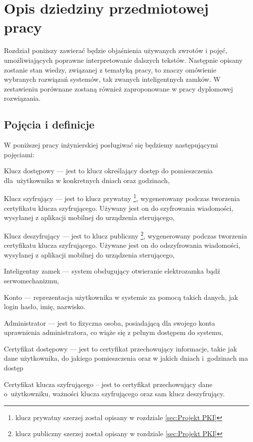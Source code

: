 % 
\newpage
\section{Opis dziedziny przedmiotowej pracy}\label{sec:dziedzina}
Rozdział poniższy zawierać będzie objaśnienia używanych zwrotów i pojęć, umożliwiających poprawne interpretowanie dalszych tekstów. Następnie opisany zostanie stan wiedzy, związanej z tematyką pracy, to znaczy omówienie wybranych rozwiązań systemów, tak zwanych inteligentnych zamków. W zestawieniu porównane zostaną również zaproponowane w pracy dyplomowej rozwiązania.
\subsection{Pojęcia i definicje}\label{sec:Pojęcia i definicje}
W poniższej pracy inżynierskiej posługiwać się będziemy następującymi pojęciami:
\begin{itemize*}
	\item {Klucz dostępowy} --- jest to  klucz określający dostęp do pomieszczenia dla~użytkownika w konkretnych dniach oraz godzinach,
	\item {Klucz szyfrujący} 
	--- jest to klucz prywatny \footnote{ klucz prywatny szerzej został opisany w rozdziale \ref{sec:Projekt PKI}}, wygenerowany podczas tworzenia certyfikatu klucza szyfrującego. Używany jest on do szyfrowania wiadomości, wysyłanej z aplikacji mobilnej do urządzenia sterującego,
	\item {Klucz deszyfrujący }
	--- jest to klucz publiczny \footnote{ klucz publiczny szerzej został opisany w rozdziale \ref{sec:Projekt PKI}}, wygenerowany podczas tworzenia certyfikatu klucza szyfrującego. Używane jest on do odszyfrowania wiadomości, wysyłanej z aplikacji mobilnej do urządzenia sterującego,
	\item {Inteligentny zamek}
	--- system obsługujący otwieranie elektrozamka bądź serwomechanizmu,
	\item {Konto}
	--- reprezentacja użytkownika w systemie za pomocą takich danych, jak login hasło, imię, nazwisko.
	\item {Administrator}
	--- jest to fizyczna osoba, posiadającą dla swojego konta uprawnienia administratora, co wiąże się z pełnym dostępem do systemu,
	\item {Certyfikat dostępowy}
	--- jest to certyfikat przechowujący informacje, takie jak dane użytkownika, do jakiego pomieszczenia oraz w jakich dniach i~godzinach	ma dostęp
	\item {Certyfikat klucza szyfrującego}
	-- jest to certyfikat przechowujący dane o~użytkowniku, ważności klucza szyfrującego oraz sam klucz deszyfrujący.
\end{itemize*}


